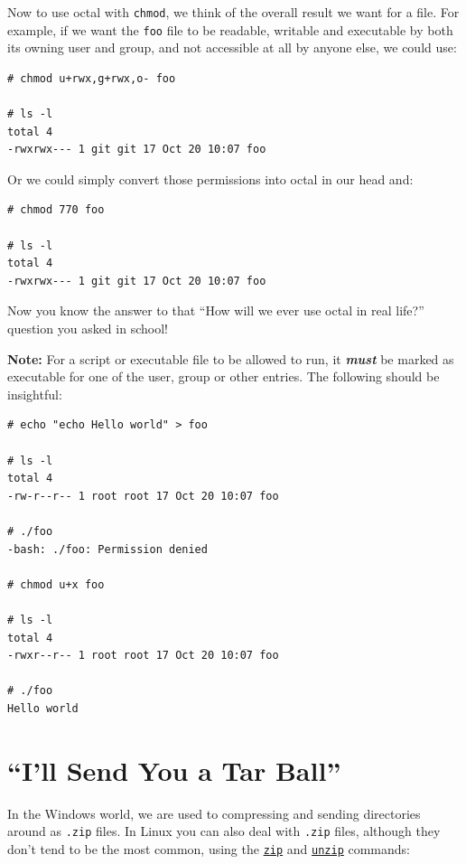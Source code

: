 \documentclass[10pt,]{book}
\numberwithin{figure}{chapter}
\begin{document}
Now to use octal with \texttt{chmod}, we think of the overall result we
want for a file. For example, if we want the \texttt{foo} file to be
readable, writable and executable by both its owning user and group, and
not accessible at all by anyone else, we could use:

\begin{verbatim}
# chmod u+rwx,g+rwx,o- foo

# ls -l
total 4
-rwxrwx--- 1 git git 17 Oct 20 10:07 foo
\end{verbatim}

Or we could simply convert those permissions into octal in our head and:

\begin{verbatim}
# chmod 770 foo

# ls -l
total 4
-rwxrwx--- 1 git git 17 Oct 20 10:07 foo
\end{verbatim}

Now you know the answer to that ``How will we ever use octal in real
life?'' question you asked in school!

\textbf{Note:} For a script or executable file to be allowed to run, it
\textbf{\emph{must}} be marked as executable for one of the user, group
or other entries. The following should be insightful:

\begin{verbatim}
# echo "echo Hello world" > foo

# ls -l
total 4
-rw-r--r-- 1 root root 17 Oct 20 10:07 foo

# ./foo
-bash: ./foo: Permission denied

# chmod u+x foo

# ls -l
total 4
-rwxr--r-- 1 root root 17 Oct 20 10:07 foo

# ./foo
Hello world
\end{verbatim}

\section{``I'll Send You a Tar Ball''}\label{ill-send-you-a-tar-ball}

In the Windows world, we are used to compressing and sending directories
around as \texttt{.zip} files. In Linux you can also deal with
\texttt{.zip} files, although they don't tend to be the most common,
using the \href{http://linux.die.net/man/1/zip}{\texttt{zip}} and
\href{http://linux.die.net/man/1/unzip}{\texttt{unzip}} commands:
\end{document}
